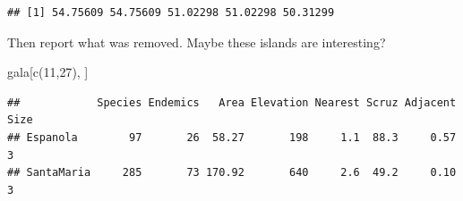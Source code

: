 \documentclass[
  ignorenonframetext,
]{beamer}
\newenvironment{Shaded}{\begin{snugshade}}{\end{snugshade}}
\newcommand{\AttributeTok}[1]{\textcolor[rgb]{0.77,0.63,0.00}{#1}}
\newcommand{\DecValTok}[1]{\textcolor[rgb]{0.00,0.00,0.81}{#1}}
\newcommand{\FunctionTok}[1]{\textcolor[rgb]{0.00,0.00,0.00}{#1}}
\newcommand{\NormalTok}[1]{#1}
\newcommand{\OtherTok}[1]{\textcolor[rgb]{0.56,0.35,0.01}{#1}}
\newcommand{\SpecialCharTok}[1]{\textcolor[rgb]{0.00,0.00,0.00}{#1}}
\begin{document}
\begin{frame}[fragile]{}
\begin{Shaded}
\end{Shaded}

\begin{verbatim}
## [1] 54.75609 54.75609 51.02298 51.02298 50.31299
\end{verbatim}
\end{frame}

\begin{frame}[fragile]{}
\protect\hypertarget{section-27}{}
Then report what was removed. Maybe these islands are interesting?

\vspace{12pt}
\tiny

\begin{Shaded}
\begin{Highlighting}[]
\NormalTok{gala[}\FunctionTok{c}\NormalTok{(}\DecValTok{11}\NormalTok{,}\DecValTok{27}\NormalTok{), ]}
\end{Highlighting}
\end{Shaded}

\begin{verbatim}
##            Species Endemics   Area Elevation Nearest Scruz Adjacent Size
## Espanola        97       26  58.27       198     1.1  88.3     0.57    3
## SantaMaria     285       73 170.92       640     2.6  49.2     0.10    3
\end{verbatim}
\end{frame}
\end{document}
